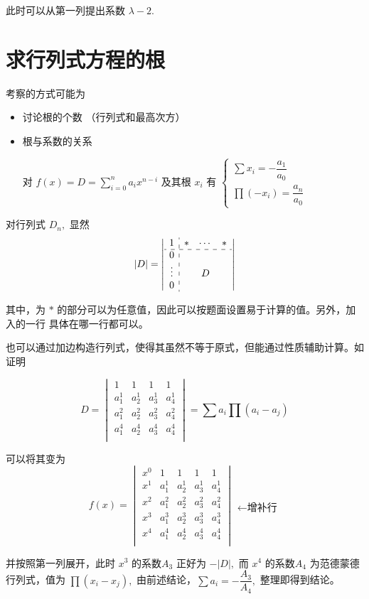 此时可以从第一列提出系数 $ \lambda - 2. $ 

\section{求行列式方程的根}

考察的方式可能为
\begin{itemize}
    \item 讨论根的个数 （行列式和最高次方）
    \item 根与系数的关系
    
    对 $ f(x) = D = \sum_{i = 0}^n a_i x^{n-i} $ 及其根 $ x_i $ 
    有 $ \begin{cases}
        \sum x_i = -\dfrac{a_1}{a_0} \\ 
        \prod (-x_i) = \dfrac{a_n}{a_0}
    \end{cases} $ 
\end{itemize}


对行列式 $ D_n, $ 显然$$
    |D| = \left|
    \begin{array}{c:ccc}
        1&*&\cdots&*\\ \hdashline
        0& & & \\
        \vdots& &D& \\
        0& & & \\
    \end{array}
    \right|
$$ 

其中，为 $ * $ 的部分可以为任意值，因此可以按题面设置易于计算的值。另外，加入的一行
具体在哪一行都可以。

也可以通过加边构造行列式，使得其虽然不等于原式，但能通过性质辅助计算。如证明

$$
    D = \begin{vmatrix}
        1&1&1 &1 \\
        a_1^1&a_2^1 &a_3^1 &a_4^1 \\
        a_1^2&a_2^2 &a_3^2 &a_4^2 \\
        a_1^4&a_2^4 &a_3^4 &a_4^4 \\
    \end{vmatrix} = \sum a_i \prod (a_i - a_j)
$$ 

可以将其变为$$
    f(x) = \begin{vmatrix}
        x^0&1&1&1 &1 \\
        x^1&a_1^1&a_2^1 &a_3^1 &a_4^1 \\
        x^2&a_1^2&a_2^2 &a_3^2 &a_4^2 \\
        x^3&a_1^3&a_2^3 &a_3^3 &a_4^3 \\
        x^4&a_1^4&a_2^4 &a_3^4 &a_4^4 \\
    \end{vmatrix} \begin{matrix}
        \\ \\ \\ \leftarrow \textrm{增补行} \\ \\
    \end{matrix}
$$ 

并按照第一列展开，此时 $ x^3 $ 的系数$ A_3 $ 正好为 $ -|D|, $ 而
$ x^4 $ 的系数$ A_4 $ 为范德蒙德行列式，值为 $ \prod (x_i-x_j), $ 
由前述结论，$ \sum a_i = -\dfrac{A_3}{A_4}, $ 整理即得到结论。
